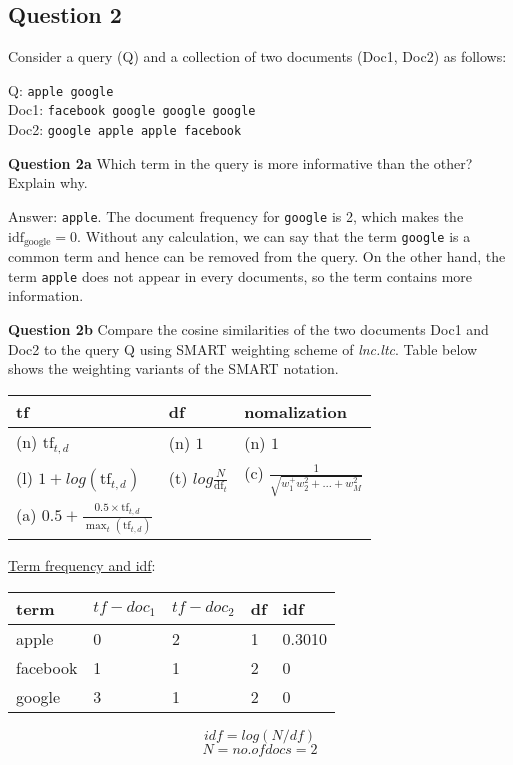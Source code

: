 \documentclass[11pt,a4paper]{report}
\begin{document}
\begin{multicols*}{2}
\section{Question 2}

\noindent Consider a query (Q) and a collection of two documents (Doc1, Doc2) as follows:

\begin{center}
Q: \verb|apple google|\\
Doc1: \verb|facebook google google google|\\
Doc2: \verb|google apple apple facebook|\\
\end{center}

\noindent \textbf{Question 2a} Which term in the query is more informative than the other? Explain why.

\noindent Answer: \verb|apple|. The document frequency for \verb|google| is 2, which makes the $\text{idf}_{\text{google}}=0$. Without any calculation, we can say that the term \verb|google| is a common term and hence can be removed from the query. On the other hand, the term \verb|apple| does not appear in every documents, so the term contains more information. 

\noindent \textbf{Question 2b} Compare the cosine similarities of the two documents Doc1 and Doc2 to the query Q using SMART weighting scheme of \textit{lnc.ltc}. Table below shows the weighting variants of the SMART notation.

\begin{center}
\begin{tabular}{|l | l | l|}
    \hline
    tf & df & nomalization \\
    \hline
    (n) $\text{tf}_{t,d}$ & (n) $1$ & (n) $1$ \\
    (l) $1 + log(\text{tf}_{t,d})$ & (t) $log \frac{N}{\text{df}_t}$ & (c) $\frac{1}{\sqrt{w_1^ + w_2^2 + \ldots + w_M^2}}$ \\
    (a) $0.5 + \frac{0.5 \times \text{tf}_{t,d}}{\max_t (\text{tf}_{t,d})}$ & & \\
    \hline
\end{tabular}
\end{center}



\noindent\underline{Term frequency and idf}:

\begin{center}
\begin{tabular}{|l | l | l | l | l|}
    \hline
    term     & $tf-doc_1$ & $tf-doc_2$ & df & idf\\
    \hline
    apple    & 0 & 2 & 1 & 0.3010\\
    facebook & 1 & 1 & 2 & 0\\
    google   & 3 & 1 & 2 & 0\\
    \hline
\end{tabular}
\end{center}
$$ idf = log(N / df) $$
$$ N = no.of docs = 2$$


\end{multicols*}
\end{document}
